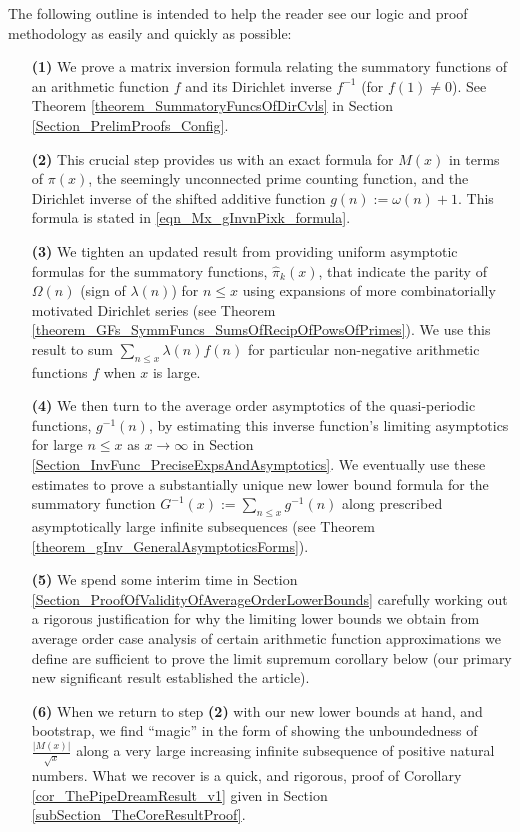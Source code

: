\documentclass[11pt,reqno,a4letter]{article}
\numberwithin{figure}{section}
\numberwithin{table}{section}
\theoremstyle{plain}
\numberwithin{theorem}{section}
\theoremstyle{definition}
\begin{document}
The following outline is intended to help 
the reader see our logic and proof methodology as easily and quickly as possible: 
\begin{itemize} 

\item[\textbf{(1)}] We prove a matrix inversion formula relating the summatory 
           functions of an arithmetic function $f$ and its Dirichlet inverse $f^{-1}$ (for $f(1) \neq 0$). 
           See 
           Theorem \ref{theorem_SummatoryFuncsOfDirCvls} in 
           Section \ref{Section_PrelimProofs_Config}.  
\item[\textbf{(2)}] This crucial step provides us with an exact formula for $M(x)$ in terms of $\pi(x)$, the seemingly 
           unconnected prime counting function, and the 
           Dirichlet inverse of the shifted additive function $g(n) := \omega(n)+1$. This 
           formula is stated in \eqref{eqn_Mx_gInvnPixk_formula}.  
\item[\textbf{(3)}] We tighten an updated result from \cite[\S 7]{MV} providing uniform asymptotic formulas for the  
           summatory functions, $\widehat{\pi}_k(x)$, that indicate the parity of 
           $\Omega(n)$ (sign of $\lambda(n)$) 
           for $n \leq x$ using expansions of more combinatorially motivated Dirichlet series 
           (see Theorem \ref{theorem_GFs_SymmFuncs_SumsOfRecipOfPowsOfPrimes}). 
           We use this result to sum $\sum_{n \leq x} \lambda(n) f(n)$ for particular non-negative arithmetic 
           functions $f$ when $x$ is large. 
\item[\textbf{(4)}] We then turn to the average order 
           asymptotics of the quasi-periodic functions, $g^{-1}(n)$, by estimating this inverse function's 
           limiting asymptotics for large $n \leq x$ as $x \rightarrow \infty$ in 
           Section \ref{Section_InvFunc_PreciseExpsAndAsymptotics}. 
           We eventually use these estimates to prove a substantially unique new lower bound formula 
           for the summatory function $G^{-1}(x) := \sum_{n \leq x} g^{-1}(n)$ along prescribed asymptotically large 
           infinite subsequences (see Theorem \ref{theorem_gInv_GeneralAsymptoticsForms}). 
\item[\textbf{(5)}] We spend some interim time in Section \ref{Section_ProofOfValidityOfAverageOrderLowerBounds} 
           carefully working out a rigorous justification for why the limiting lower bounds we obtain from average 
           order case analysis of certain arithmetic function approximations 
           we define are sufficient to prove the limit supremum corollary below 
           (our primary new significant result established the article). 
\item[\textbf{(6)}] When we return to step \textbf{(2)} 
           with our new lower bounds at hand, and bootstrap, we find ``magic'' in the form of 
           showing the unboundedness of $\frac{|M(x)|}{\sqrt{x}}$ 
           along a very large increasing infinite subsequence 
           of positive natural numbers. What we recover is a quick, and rigorous, proof of 
           Corollary \ref{cor_ThePipeDreamResult_v1} given in 
           Section \ref{subSection_TheCoreResultProof}. 
           

\end{itemize}
\end{document}
